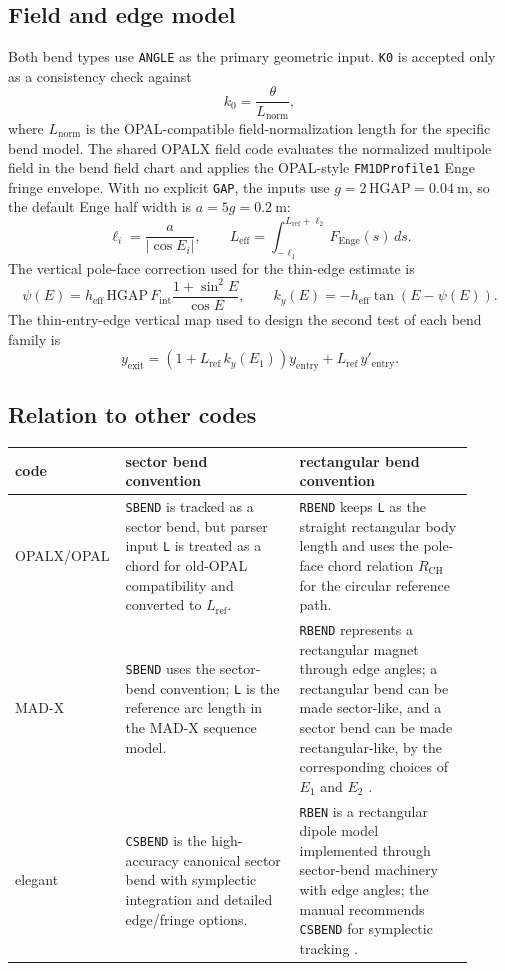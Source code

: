 \documentclass[11pt]{article}
\newcommand{\code}[1]{\texttt{#1}}
\begin{document}
\subsection{Field and edge model}

Both bend types use \code{ANGLE} as the primary geometric input.  \code{K0} is
accepted only as a consistency check against
\[
  k_0 = \frac{\theta}{L_\mathrm{norm}},
\]
where \(L_\mathrm{norm}\) is the OPAL-compatible field-normalization length for
the specific bend model.  The shared OPALX field code evaluates the normalized
multipole field in the bend field chart and applies the OPAL-style
\code{FM1DProfile1} Enge fringe envelope.  With no explicit \code{GAP}, the
inputs use \(g=2\,\mathrm{HGAP}=0.04\ \mathrm{m}\), so the default Enge half
width is \(a=5g=0.2\ \mathrm{m}\):
\[
  \ell_i = \frac{a}{|\cos E_i|},
  \qquad
  L_\mathrm{eff} =
  \int_{-\ell_1}^{L_\mathrm{ref}+\ell_2} F_\mathrm{Enge}(s)\,ds.
\]
The vertical pole-face correction used for the thin-edge estimate is
\[
  \psi(E)
    = h_\mathrm{eff}\,\mathrm{HGAP}\,F_\mathrm{int}
      \frac{1+\sin^2 E}{\cos E},
  \qquad
  k_y(E) = -h_\mathrm{eff}\tan\!\left(E-\psi(E)\right).
\]
The thin-entry-edge vertical map used to design the second test of each bend
family is
\[
  y_\mathrm{exit}
    = \left(1 + L_\mathrm{ref}\,k_y(E_1)\right)y_\mathrm{entry}
      + L_\mathrm{ref}\,y'_\mathrm{entry}.
\]

\subsection{Relation to other codes}

\begin{center}
\begin{tabular}{@{}>{\raggedright\arraybackslash}p{0.17\linewidth}
                  >{\raggedright\arraybackslash}p{0.37\linewidth}
                  >{\raggedright\arraybackslash}p{0.37\linewidth}@{}}
\toprule
code & sector bend convention & rectangular bend convention \\
\midrule
OPALX/OPAL &
\code{SBEND} is tracked as a sector bend, but parser input \code{L} is treated
as a chord for old-OPAL compatibility and converted to \(L_\mathrm{ref}\). &
\code{RBEND} keeps \code{L} as the straight rectangular body length and uses
the pole-face chord relation \(R_\mathrm{CH}\) for the circular reference
path. \\
MAD-X &
\code{SBEND} uses the sector-bend convention; \code{L} is the reference arc
length in the MAD-X sequence model. &
\code{RBEND} represents a rectangular magnet through edge angles; a rectangular
bend can be made sector-like, and a sector bend can be made rectangular-like,
by the corresponding choices of \(E_1\) and \(E_2\) \cite{madx}. \\
elegant &
\code{CSBEND} is the high-accuracy canonical sector bend with symplectic
integration and detailed edge/fringe options. &
\code{RBEN} is a rectangular dipole model implemented through sector-bend
machinery with edge angles; the manual recommends \code{CSBEND} for
symplectic tracking \cite{elegant}. \\
\bottomrule
\end{tabular}
\end{center}
\end{document}
